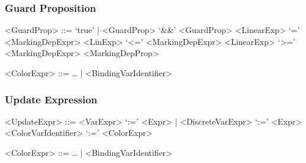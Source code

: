 \documentclass{article}
\begin{document}
\subsubsection{Guard Proposition}
\begin{scriptsize}
\begin{grammar}
  <GuardProp> ::= `true' | <GuardProp> `\&\&' <GuardProp>
  \alt <LinearExp> `=' <MarkingDepExpr> \alt <LinExp> `<=' <MarkingDepExpr>
  \alt <LinearExp> `>=' <MarkingDepExpr>
  \alt <MarkingDepProp>

  <ColorExpr> ::= \dots\! | <BindingVarIdentifier>
\end{grammar}
\end{scriptsize}

\subsubsection{Update Expression}

\begin{scriptsize}
\begin{grammar}
  <UpdateExpr> ::= <VarExpr> `:=' <Expr> | <DiscreteVarExpr> `:=' <Expr>
  \alt <ColorVarIdentifier> `:=' <ColorExpr>

   <ColorExpr> ::= \dots\! | <BindingVarIdentifier>
\end{grammar}
\end{scriptsize}
\end{document}
